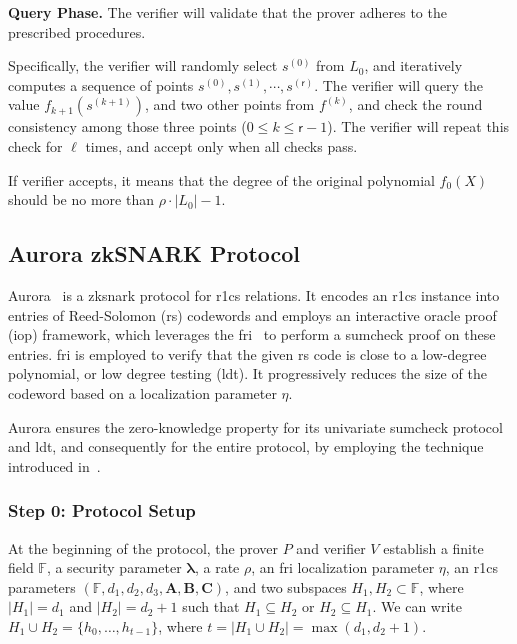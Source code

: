 \noindent\textbf{Query Phase.}
The verifier will validate that the prover adheres to the prescribed procedures.

Specifically, the verifier will randomly select $s^{(0)}$ from $L_0$, and iteratively computes a sequence of points $s^{(0)}, s^{(1)}, \cdots , s^{(\mathsf{r})}$. The verifier will query the value $f_{k+1}(s^{(k+1)})$, and two other points from $f^{(k)}$, and check the round consistency among those three points ($0\le k\le \mathsf{r} -1$). The verifier will repeat this check for $\ell$ times, and accept only when all checks pass.

If verifier accepts, it means that the degree of the original polynomial $f_0(X)$ should be no more than $\rho\cdot |L_{0}| -1$.


\subsection{Aurora zkSNARK Protocol}


Aurora~\cite{Aurora2019} is a \gls{zksnark} protocol for \gls{r1cs} relations. It encodes an \gls{r1cs} instance into entries of Reed-Solomon (\gls{rs}) codewords and employs an interactive oracle proof (\gls{iop}) framework, which leverages the \gls{fri}~\cite{FRI2018} to perform a sumcheck proof on these entries. \gls{fri} is employed to verify that the given \gls{rs} code is close to a low-degree polynomial, or low degree testing (\gls{ldt}). It progressively reduces the size of the codeword based on a localization parameter $\eta$.

Aurora ensures the zero-knowledge property for its univariate sumcheck protocol and \gls{ldt}, and consequently for the entire protocol, by employing the technique introduced in~\cite{Ben-Sasson2016Zero-Knowledge}.

\subsubsection{Step 0: Protocol Setup}
At the beginning of the protocol, the prover $P$ and verifier $V$ establish a finite field \( \mathbb{F} \), a security parameter $\boldsymbol{\lambda}$, a rate $\rho$, an \gls{fri} localization parameter $\eta$, an \gls{r1cs} parameters
\(
(\mathbb{F}, d_1, d_2, d_3, \mathbf{A}, \mathbf{B}, \mathbf{C})
\),
 and two subspaces \( H_1, H_2 \subset \mathbb{F} \), where \( |H_1| = d_1 \) and \( |H_2| = d_2 + 1 \) such that $H_1 \subseteq H_2$ or $H_2 \subseteq H_1$. We can write $H_1 \cup H_2 = \{h_0, \dots, h_{t-1}\}$, where $t = |H_1 \cup H_2| = \max(d_1, d_2+1)$. 

